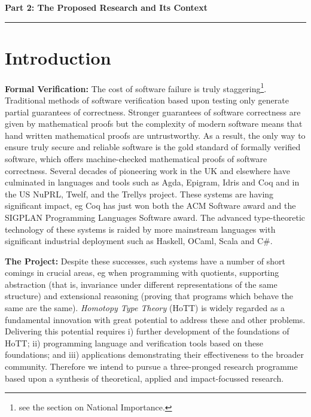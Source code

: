 \documentclass[a4paper,11pt]{article}
\begin{document}
\newpage

\noindent
{\bf \Large Part 2: The Proposed Research and Its Context}

\vspace*{-0.23in}

\begin{center}
\rule{170mm}{.5mm}
\end{center}

\vspace*{-0.3in}

\section{Introduction}\label{sec:intro}

{\bf Formal Verification:} The cost of software failure is truly
staggering\footnote{see the section on National
  Importance.}. Traditional methods of software verification based
upon testing only generate partial guarantees of correctness. Stronger
guarantees of software correctness are given by mathematical proofs
but the complexity of modern software means that hand written
mathematical proofs are untrustworthy. As a result, the only way to
ensure truly secure and reliable software is the gold standard of
formally verified software, which offers machine-checked mathematical
proofs of software correctness. Several decades of pioneering work in
the UK and elsewhere have culminated in languages and tools
such as Agda, Epigram, Idris and Coq and in the US NuPRL, Twelf, and
the Trellys project. These systems are having significant impact,
eg Coq has just won both the ACM Software award and the SIGPLAN
Programming Languages Software award. The advanced type-theoretic
technology of these systems is raided by more mainstream languages
with significant industrial deployment such as Haskell, OCaml, Scala
and C\#.

{\bf The Project:} Despite these successes, such systems have a number
of short comings in crucial areas, eg when programming with quotients,
supporting abstraction (that is, invariance under different
representations of the same structure) and extensional reasoning
(proving that programs which behave the same are the same).  {\em
  Homotopy Type Theory} (HoTT) is widely regarded as a fundamental
innovation with great potential to address these and other problems.
Delivering this potential requires i) further development of the
foundations of HoTT; ii) programming language and verification tools
based on these foundations; and iii) applications demonstrating their
effectiveness to the broader community.  Therefore we intend to pursue
a three-pronged research programme based upon a synthesis of
theoretical, applied and impact-focussed research.
\end{document}
